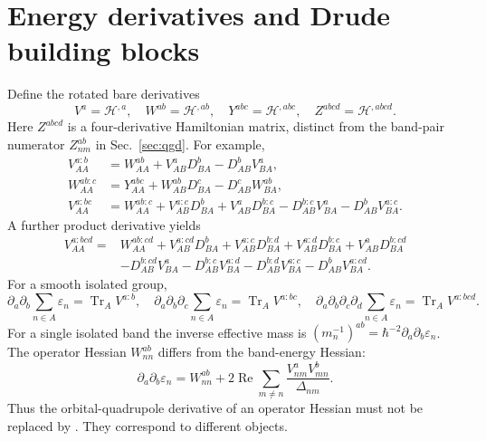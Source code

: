 \documentclass[prx,amsmath,amssymb,superscriptaddress,longbibliography]{revtex4-2}
\newcommand{\Tr}{\operatorname{Tr}}
\newcommand{\Rea}{\operatorname{Re}}
\newcommand{\code}[1]{\texttt{\detokenize{#1}}}
\begin{document}
\section{Energy derivatives and Drude building blocks}
\label{sec:energy}
Define the rotated bare derivatives
\begin{equation}
 V^a=\mathcal H^{,a},\quad W^{ab}=\mathcal H^{,ab},\quad
 Y^{abc}=\mathcal H^{,abc},\quad Z^{abcd}=\mathcal H^{,abcd}.
 \label{eq:energy-ingredients}
\end{equation}
Here $Z^{abcd}$ is a four-derivative Hamiltonian matrix, distinct from the
band-pair numerator $Z_{nm}^{ab}$ in Sec.~\ref{sec:qgd}.
For example,
\begin{align}
 V_{AA}^{a:b}&=W_{AA}^{ab}+V_{AB}^aD_{BA}^b-D_{AB}^bV_{BA}^a,
 \label{eq:invmass}\\
 W_{AA}^{ab:c}&=Y_{AA}^{abc}+W_{AB}^{ab}D_{BA}^c-D_{AB}^cW_{BA}^{ab},
 \label{eq:derW}\\
 V_{AA}^{a:bc}&=W_{AA}^{ab:c}
 +V_{AB}^{a:c}D_{BA}^b+V_{AB}^aD_{BA}^{b:c}
 -D_{AB}^{b:c}V_{BA}^a-D_{AB}^bV_{BA}^{a:c}.
 \label{eq:third-energy}
\end{align}
A further product derivative yields
\begin{align}
 V_{AA}^{a:bcd}={}&W_{AA}^{ab:cd}
 +V_{AB}^{a:cd}D_{BA}^b+V_{AB}^{a:c}D_{BA}^{b:d}
 +V_{AB}^{a:d}D_{BA}^{b:c}+V_{AB}^aD_{BA}^{b:cd}
 \nonumber\\
 &-D_{AB}^{b:cd}V_{BA}^a-D_{AB}^{b:c}V_{BA}^{a:d}
 -D_{AB}^{b:d}V_{BA}^{a:c}-D_{AB}^bV_{BA}^{a:cd}.
 \label{eq:fourth-energy}
\end{align}
For a smooth isolated group,
\begin{equation}
 \partial_a\partial_b\sum_{n\in A}\varepsilon_n=\Tr_A V^{a:b},\quad
 \partial_a\partial_b\partial_c\sum_{n\in A}\varepsilon_n=\Tr_A V^{a:bc},\quad
 \partial_a\partial_b\partial_c\partial_d\sum_{n\in A}\varepsilon_n=\Tr_A V^{a:bcd}.
 \label{eq:energy-traces}
\end{equation}
For a single isolated band the inverse effective mass is
$(m_n^{-1})^{ab}=\hbar^{-2}\partial_a\partial_b\varepsilon_n$.
The operator Hessian $W_{nn}^{ab}$ differs from the band-energy Hessian:
\begin{equation}
 \partial_a\partial_b\varepsilon_n
 =W_{nn}^{ab}+2\Rea\sum_{m\ne n}\frac{V_{nm}^aV_{mn}^b}{\Delta_{nm}}.
 \label{eq:hessian-distinction}
\end{equation}
Thus the orbital-quadrupole derivative of an operator Hessian must not be
replaced by \code{Der3E}. They correspond to different objects.
\end{document}
